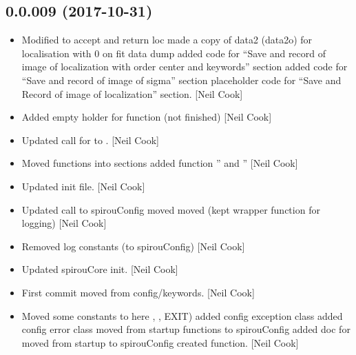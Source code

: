 \documentclass[a4paper,10pt,english]{report}
\begin{document}
\subsection{0.0.009 (2017-10-31)}
\label{\detokenize{misc/changelog:id541}}\begin{itemize}
\item {} 
Modified  to accept and
return loc made a copy of data2  (data2o) for localisation with 0 on
fit data dump added code for “Save and record of image of localization
with order center and keywords” section added code for “Save and
record of image of sigma” section placeholder code for “Save and
Record of image of localization” section. {[}Neil Cook{]}

\item {} 
Added empty holder for  function (not
finished) {[}Neil Cook{]}

\item {} 
Updated call for  to . {[}Neil Cook{]}

\item {} 
Moved functions into sections added function ” and
” {[}Neil Cook{]}

\item {} 
Updated init file. {[}Neil Cook{]}

\item {} 
Updated call to spirouConfig moved  moved
 (kept wrapper function for logging) {[}Neil Cook{]}

\item {} 
Removed log constants (to spirouConfig) {[}Neil Cook{]}

\item {} 
Updated spirouCore init. {[}Neil Cook{]}

\item {} 
First commit moved from config/keywords. {[}Neil Cook{]}

\item {} 
Moved some constants to here , , EXIT) added
config exception class added config error class moved
 from startup functions to spirouConfig added doc
for  moved  from startup to spirouConfig
created  function. {[}Neil Cook{]}


\end{itemize}
\end{document}
